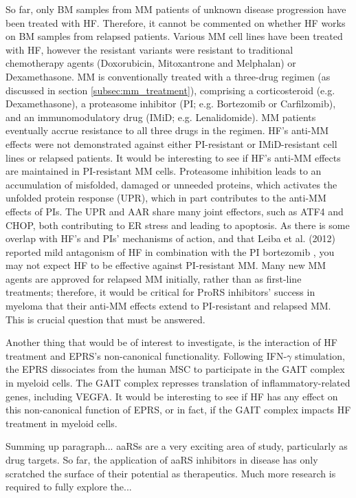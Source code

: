 So far, only BM samples from MM patients of unknown disease progression have been treated with HF\@.
Therefore, it cannot be commented on whether HF works on BM samples from relapsed patients.
Various MM cell lines have been treated with HF, however the resistant variants were resistant to traditional chemotherapy agents (Doxorubicin, Mitoxantrone and Melphalan) or Dexamethasone.
MM is conventionally treated with a three-drug regimen (as discussed in section \ref{subsec:mm_treatment}), comprising a corticosteroid (e.g. Dexamethasone), a proteasome inhibitor (PI; e.g. Bortezomib or Carfilzomib), and an immunomodulatory drug (IMiD; e.g. Lenalidomide).
MM patients eventually accrue resistance to all three drugs in the regimen.
HF's anti-MM effects were not demonstrated against either PI-resistant or IMiD-resistant cell lines or relapsed patients.
It would be interesting to see if HF's anti-MM effects are maintained in PI-resistant MM cells.
Proteasome inhibition leads to an accumulation of misfolded, damaged or unneeded proteins, which activates the unfolded protein response (UPR), which in part contributes to the anti-MM effects of PIs.
The UPR and AAR share many joint effectors, such as ATF4 and CHOP, both contributing to ER stress and leading to apoptosis.
As there is some overlap with HF's and PIs' mechanisms of action, and that Leiba et al. (2012) reported mild antagonism of HF in combination with the PI bortezomib \cite{leiba2012halofuginone}, you may not expect HF to be effective against PI-resistant MM.
Many new MM agents are approved for relapsed MM initially, rather than as first-line treatments; therefore, it would be critical for ProRS inhibitors' success in myeloma that their anti-MM effects extend to PI-resistant and relapsed MM.
This is crucial question that must be answered.

Another thing that would be of interest to investigate, is the interaction of HF treatment and EPRS's non-canonical functionality.
Following IFN-$\gamma$ stimulation, the EPRS dissociates from the human MSC to participate in the GAIT complex in myeloid cells.
The GAIT complex represses translation of inflammatory-related genes, including VEGFA.
It would be interesting to see if HF has any effect on this non-canonical function of EPRS, or in fact, if the GAIT complex impacts HF treatment in myeloid cells.

Summing up paragraph...
aaRSs are a very exciting area of study, particularly as drug targets.
So far, the application of aaRS inhibitors in disease has only scratched the surface of their potential as therapeutics.
Much more research is required to fully explore the...
